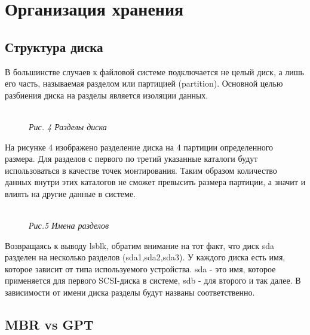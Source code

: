 \documentclass[14pt, a4paper]{article}
\begin{document}
\section*{Организация хранения} 

\subsection*{Структура диска} 

В большинстве случаев к файловой системе подключается не целый диск, а лишь его часть,
называемая разделом или партицией (partition). Основной целью разбиения диска на разделы
является изоляции данных.

\begin{figure}[h]
    \centering
    \\ 
    \small\textit{Рис. 4 Разделы диска}  
    \label{framework} 
\end{figure}

\newpage

На рисунке 4 изображено разделение диска на 4 партиции определенного размера. Для разделов с
первого по третий указанные каталоги будут использоваться в качестве точек монтирования. Таким
образом количество данных внутри этих каталогов не сможет превысить размера партиции, а значит
и влиять на другие данные в системе.

\begin{figure}[h]
    \centering
    \\ 
    \small\textit{Рис.5 Имена разделов}  
    \label{framework} 
\end{figure}

Возвращаясь к выводу \colorbox{backcolour}{lsblk}, обратим внимание на тот факт, что диск sda разделен на несколько
разделов (sda1,sda2,sda3). У каждого диска есть имя, которое зависит от типа используемого
устройства. \colorbox{backcolour}{sda} - это имя, которое применяется для первого SCSI-диска в системе, \colorbox{backcolour}{sdb} - для второго
и так далее. В зависимости от имени диска разделы будут названы соответственно.

\subsection*{MBR vs GPT} 
\end{document}
